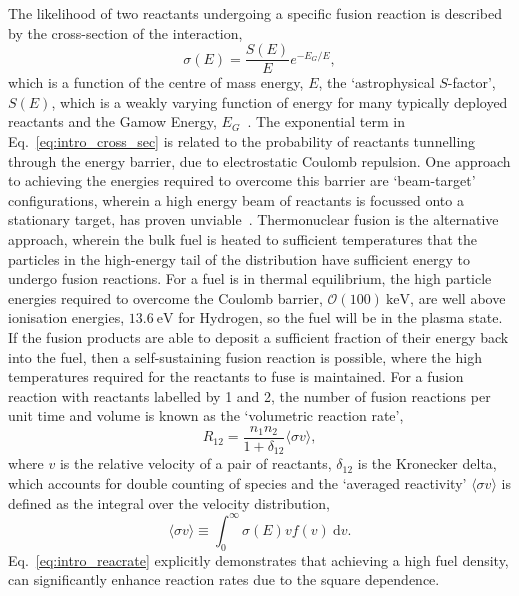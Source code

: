 The likelihood of two reactants undergoing a specific fusion reaction is described by the cross-section of the interaction,
\begin{equation}
    \label{eq:intro_cross_sec}
    \sigma(E) = \frac{S(E)}{E} e^{-E_G/E},
\end{equation}
which is a function of the centre of mass energy, $E$, the `astrophysical $S$-factor', $S(E)$, which is a weakly varying function of energy for many typically deployed reactants and the Gamow Energy, $E_G$~\cite{atzeni_physics_2004}.
The exponential term in Eq.~\ref{eq:intro_cross_sec} is related to the probability of reactants tunnelling through the energy barrier, due to electrostatic Coulomb repulsion.
One approach to achieving the energies required to overcome this barrier are `beam-target' configurations, wherein a high energy beam of reactants is focussed onto a stationary target, has proven unviable~\cite{rider_general_1995}.
Thermonuclear fusion is the alternative approach, wherein the bulk fuel is heated to sufficient temperatures that the particles in the high-energy tail of the distribution have sufficient energy to undergo fusion reactions.
For a fuel is in thermal equilibrium, the high particle energies required to overcome the Coulomb barrier, $\mathcal{O}(100)\ \text{keV}$, are well above ionisation energies, $13.6\ \text{eV}$ for Hydrogen, so the fuel will be in the plasma state.
If the fusion products are able to deposit a sufficient fraction of their energy back into the fuel, then a self-sustaining fusion reaction is possible, where the high temperatures required for the reactants to fuse is maintained.
For a fusion reaction with reactants labelled by 1 and 2, the number of fusion reactions per unit time and volume is known as the `volumetric reaction rate',
\begin{equation}
    \label{eq:intro_reacrate}
    R_{12} = \frac{n_1 n_2}{1+\delta_{12}} \langle \sigma v \rangle,
\end{equation}
where $v$ is the relative velocity of a pair of reactants, $\delta_{12}$ is the Kronecker delta, which accounts for double counting of species and the `averaged reactivity' $\langle \sigma v \rangle$ is defined as the integral over the velocity distribution,
\begin{equation}
    \label{eq:intro_reactivity}
    \langle \sigma v \rangle \equiv \int_0^{\infty} \sigma(E) v f(v)\ \text{d}v.
\end{equation}
Eq.~\ref{eq:intro_reacrate} explicitly demonstrates that achieving a high fuel density, can significantly enhance reaction rates due to the square dependence.

